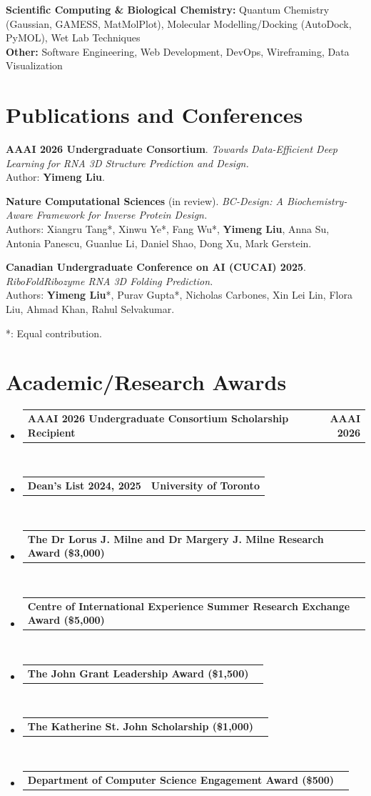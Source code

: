 \documentclass[letterpaper,11pt]{article}
\makeatletter
\newcommand{\resumeawardlist}[2]{
  \item \begin{tabular*}{\textwidth}{@{}l@{\extracolsep{\fill}}r@{}}
    \textbf{#1} & \textbf{\small #2} \\
  \end{tabular*}\vspace{-4pt}
}
\newcommand{\resumeSubHeadingListStart}{\begin{itemize}[leftmargin=0.0in, label={}]}
\newcommand{\resumeSubHeadingListEnd}{\end{itemize}}
\makeatother
\begin{document}
\textbf{Scientific Computing \& Biological Chemistry:} Quantum Chemistry (Gaussian, GAMESS, MatMolPlot), Molecular Modelling/Docking (AutoDock, PyMOL), Wet Lab Techniques \\[0.5em]
\textbf{Other:} Software Engineering, Web Development, DevOps, Wireframing, Data Visualization

\section{Publications and Conferences}

\textbf{AAAI 2026 Undergraduate Consortium}.  
\textit{Towards Data-Efficient Deep Learning for RNA 3D Structure Prediction and Design. } \\
Author: \textbf{Yimeng Liu}.

\textbf{Nature Computational Sciences} (in review).  
\textit{BC-Design: A Biochemistry-Aware Framework for Inverse Protein Design.  \\
}Authors: Xiangru Tang*, Xinwu Ye*, Fang Wu*, \textbf{Yimeng Liu}, Anna Su, Antonia Panescu, Guanlue Li, Daniel Shao, Dong Xu, Mark Gerstein.  

\textbf{Canadian Undergraduate Conference on AI (CUCAI) 2025}. 
\textit{RiboFold\textemdash Ribozyme RNA 3D Folding Prediction. } \\
Authors: \textbf{Yimeng Liu}*, Purav Gupta*, Nicholas Carbones, Xin Lei Lin, Flora Liu, Ahmad Khan, Rahul Selvakumar.  

*: Equal contribution.


\section{Academic/Research Awards}
  \resumeSubHeadingListStart
  \resumeawardlist
      {AAAI 2026 Undergraduate Consortium Scholarship Recipient}{AAAI 2026} \\[0.5em]

\resumeawardlist
      {Dean's List 2024, 2025}{University of Toronto} \\[0.5em]
\resumeawardlist {The Dr Lorus J. Milne and Dr Margery J. Milne Research Award (\$3,000)}{}\\[0.5em]
\resumeawardlist {Centre of International Experience Summer Research Exchange Award (\$5,000)} {}\\[0.5em]
\resumeawardlist {The John Grant Leadership Award (\$1,500)}{}\\[0.5em]
\resumeawardlist
  {The Katherine St. John Scholarship (\$1,000)}{}\\[0.5em]
\resumeawardlist
    {Department of Computer Science Engagement Award (\$500)}{}\\[0.5em]
\resumeSubHeadingListEnd
\end{document}
